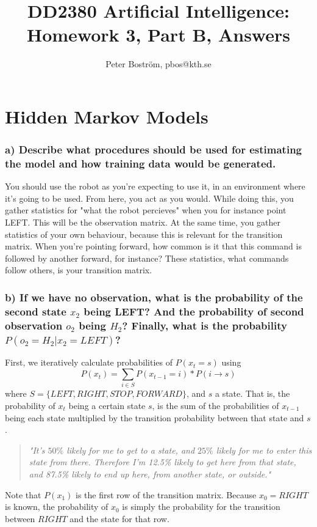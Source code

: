 \documentclass[a4paper] {article}
\title {DD2380 Artificial Intelligence:\\
	Homework 3, Part B, Answers}
\author {Peter Boström, pbos@kth.se}
\begin{document}
\maketitle

\section*{Hidden Markov Models}
	\subsubsection*{a) Describe what procedures should be used for estimating the model and how training data would be generated.}

		You should use the robot as you're expecting to use it, in an environment where it's going to be used. From here, you act as you would. While doing this, you gather statistics for "what the robot percieves" when you for instance point LEFT. This will be the observation matrix. At the same time, you gather statistics of your own behaviour, because this is relevant for the transition matrix. When you're pointing forward, how common is it that this command is followed by another forward, for instance? These statistics, what commands follow others, is your transition matrix. 

	\subsubsection*{b) If we have no observation, what is the probability of the second state $x_2$ being LEFT? And the probability of second observation $o_2$ being $H_2$? Finally, what is the probability $P(o_2 = H_2|x_2 = LEFT)$?}

		First, we iteratively calculate probabilities of $P(x_t=s)$ using $$P(x_t) = \sum_{i \in S}{P(x_{t-1}=i)*P(i\rightarrow s)}$$ where $S = \{LEFT, RIGHT, STOP, FORWARD\}$, and $s$ a state.
		That is, the probability of $x_t$ being a certain state $s$, is the sum of the probabilities of $x_{t-1}$ being each state multiplied by the transition probability between that state and $s$.

		\begin{quote} \emph{"It's $50\%$ likely for me to get to a state, and $25\%$ likely for me to enter this state from there. Therefore I'm 12.5\% likely to get here from that state, and 87.5\% likely to end up here, from another state, or outside."} \end{quote}

		Note that $P(x_1)$ is the first row of the transition matrix. Because $x_0=RIGHT$ is known, the probability of $x_0$ is simply the probability for the transition between $RIGHT$ and the state for that row.
\end{document}
